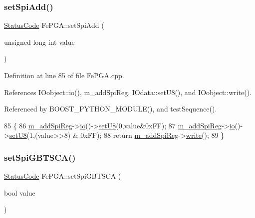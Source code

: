 \subsubsection{\texorpdfstring{set\+Spi\+Add()}{setSpiAdd()}}
{\footnotesize\ttfamily \hyperlink{classStatusCode}{Status\+Code} Fe\+P\+G\+A\+::set\+Spi\+Add (\begin{DoxyParamCaption}\item[{unsigned long int}]{value }\end{DoxyParamCaption})}



Definition at line 85 of file Fe\+P\+G\+A.\+cpp.



References I\+Oobject\+::io(), m\+\_\+add\+Spi\+Reg, I\+Odata\+::set\+U8(), and I\+Oobject\+::write().



Referenced by B\+O\+O\+S\+T\+\_\+\+P\+Y\+T\+H\+O\+N\+\_\+\+M\+O\+D\+U\+L\+E(), and test\+Sequence().


\begin{DoxyCode}
85                                                     \{
86   \hyperlink{classFePGA_a569eb8410924bec1c8279ca80dc37a6a}{m\_addSpiReg}->\hyperlink{classIOobject_af04fb94137c3d86849f478ac5afab5d1}{io}()->\hyperlink{classIOdata_a6c4fb2f2af01889ada889c2b7aceb24d}{setU8}(0,value&0xFF);
87   \hyperlink{classFePGA_a569eb8410924bec1c8279ca80dc37a6a}{m\_addSpiReg}->\hyperlink{classIOobject_af04fb94137c3d86849f478ac5afab5d1}{io}()->\hyperlink{classIOdata_a6c4fb2f2af01889ada889c2b7aceb24d}{setU8}(1,(value>>8) & 0xFF);
88   \textcolor{keywordflow}{return} \hyperlink{classFePGA_a569eb8410924bec1c8279ca80dc37a6a}{m\_addSpiReg}->\hyperlink{classIOobject_a9f6984bc9f0fadcf800f1be2523ac744}{write}();
89 \}
\end{DoxyCode}
\mbox{\label{classFePGA_a59b840619341df26918a6c26e8b8e72b}} 
\subsubsection{\texorpdfstring{set\+Spi\+G\+B\+T\+S\+C\+A()}{setSpiGBTSCA()}}
{\footnotesize\ttfamily \hyperlink{classStatusCode}{Status\+Code} Fe\+P\+G\+A\+::set\+Spi\+G\+B\+T\+S\+CA (\begin{DoxyParamCaption}\item[{bool}]{value }\end{DoxyParamCaption})}



